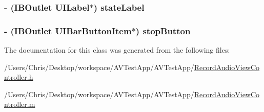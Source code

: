\hypertarget{interface_record_audio_view_controller_a52534242d22e0b6ea43902c6e3a5b3f6}{
\subsubsection[{state\-Label}]{\setlength{\rightskip}{0pt plus 5cm}-\/ (\-I\-B\-Outlet \-U\-I\-Label$\ast$) {\bf state\-Label}}}\label{interface_record_audio_view_controller_a52534242d22e0b6ea43902c6e3a5b3f6}
\hypertarget{interface_record_audio_view_controller_a65f9aafbdd50215aa5b3572614428bfb}{
\subsubsection[{stop\-Button}]{\setlength{\rightskip}{0pt plus 5cm}-\/ (\-I\-B\-Outlet \-U\-I\-Bar\-Button\-Item$\ast$) {\bf stop\-Button}}}\label{interface_record_audio_view_controller_a65f9aafbdd50215aa5b3572614428bfb}


\-The documentation for this class was generated from the following files\-:\begin{DoxyCompactItemize}
\item 
/\-Users/\-Chris/\-Desktop/workspace/\-A\-V\-Test\-App/\-A\-V\-Test\-App/\hyperlink{_record_audio_view_controller_8h}{\-Record\-Audio\-View\-Controller.\-h}\item 
/\-Users/\-Chris/\-Desktop/workspace/\-A\-V\-Test\-App/\-A\-V\-Test\-App/\hyperlink{_record_audio_view_controller_8m}{\-Record\-Audio\-View\-Controller.\-m}\end{DoxyCompactItemize}
